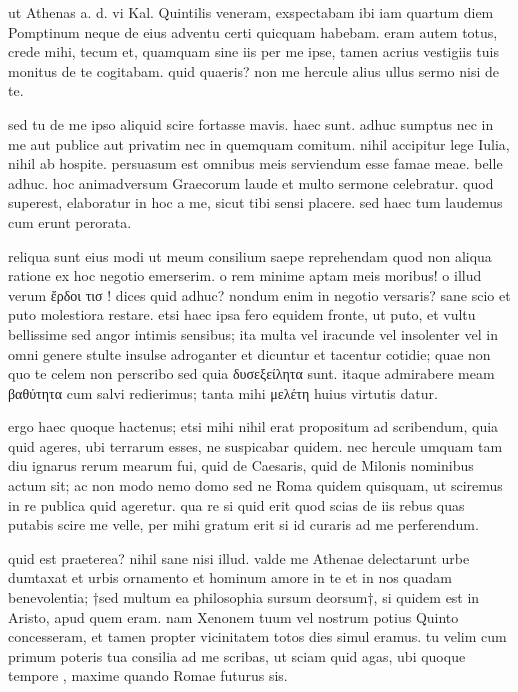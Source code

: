 


 ut Athenas a. d. vi Kal. Quintilis veneram, exspectabam ibi iam quartum diem Pomptinum neque de eius adventu certi quicquam habebam. eram autem totus, crede mihi, tecum et, quamquam sine iis per me ipse, tamen acrius vestigiis tuis monitus de te cogitabam. quid quaeris? non me hercule alius ullus sermo nisi de te.

 sed tu de me ipso aliquid scire fortasse mavis. haec sunt. adhuc sumptus nec in me aut publice aut privatim nec in quemquam comitum. nihil accipitur lege Iulia, nihil ab hospite. persuasum est omnibus meis serviendum esse famae meae. belle adhuc. hoc animadversum Graecorum laude et multo sermone celebratur. quod superest, elaboratur in hoc a me, sicut tibi sensi placere. sed haec tum laudemus cum erunt perorata.

 reliqua sunt eius modi ut meum consilium saepe reprehendam quod non aliqua ratione ex hoc negotio emerserim. o rem minime aptam meis moribus! o illud verum ἔρδοι τισ ! dices quid adhuc? nondum enim in negotio versaris? sane scio et puto molestiora restare. etsi haec ipsa fero equidem fronte, ut puto, et vultu bellissime sed angor intimis sensibus; ita multa vel iracunde vel insolenter vel in omni genere stulte insulse adroganter et dicuntur et tacentur cotidie; quae non quo te celem non perscribo sed quia δυσεξείλητα sunt. itaque admirabere meam βαθύτητα cum salvi redierimus; tanta mihi μελέτη huius virtutis datur.

 ergo haec quoque hactenus; etsi mihi nihil erat propositum ad scribendum, quia quid ageres, ubi terrarum esses, ne suspicabar quidem. nec hercule umquam tam diu ignarus rerum mearum fui, quid de Caesaris, quid de Milonis nominibus actum sit; ac non modo nemo domo sed ne Roma quidem quisquam, ut sciremus in re publica quid ageretur. qua re si quid erit quod scias de iis rebus quas putabis scire me velle, per mihi gratum erit si id curaris ad me perferendum.

 quid est praeterea? nihil sane nisi illud. valde me Athenae delectarunt urbe dumtaxat et urbis ornamento et hominum amore in te et in nos quadam benevolentia; †sed multum ea philosophia sursum deorsum†, si quidem est in Aristo, apud quem eram. nam Xenonem tuum vel nostrum potius Quinto concesseram, et tamen propter vicinitatem totos dies simul eramus. tu velim cum primum poteris tua consilia ad me scribas, ut sciam quid agas, ubi quoque tempore , maxime quando Romae futurus sis.
